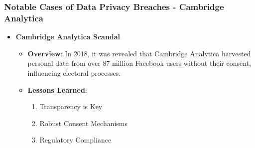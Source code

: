 \documentclass[aspectratio=169]{beamer}
\begin{document}
\begin{frame}[fragile]
    \frametitle{Notable Cases of Data Privacy Breaches - Cambridge Analytica}
    \begin{itemize}
        \item \textbf{Cambridge Analytica Scandal}
        \begin{itemize}
            \item \textbf{Overview}: In 2018, it was revealed that Cambridge Analytica harvested personal data from over 87 million Facebook users without their consent, influencing electoral processes.
            \item \textbf{Lessons Learned}:
            \begin{enumerate}
                \item Transparency is Key
                \item Robust Consent Mechanisms
                \item Regulatory Compliance
            \end{enumerate}
        \end{itemize}
    \end{itemize}
\end{frame}
\end{document}
